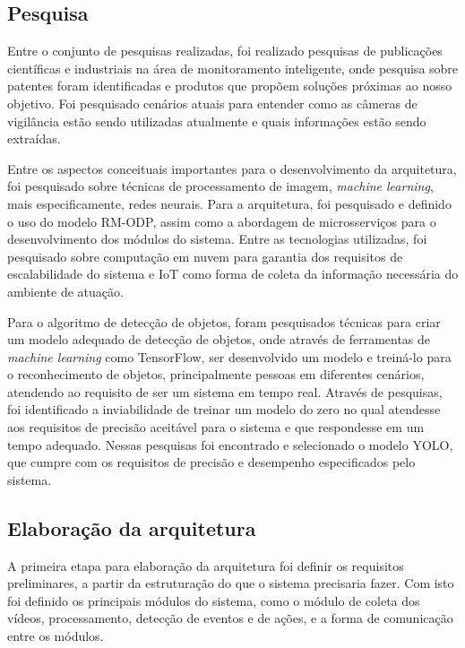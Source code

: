 \documentclass[]{politex}
\begin{document}
\subsection{Pesquisa}
Entre o conjunto de pesquisas realizadas, foi realizado pesquisas de publicações científicas e industriais na área de monitoramento inteligente, onde pesquisa sobre patentes foram identificadas e produtos que propõem soluções próximas ao nosso objetivo. Foi pesquisado cenários atuais para entender como as câmeras de vigilância estão sendo utilizadas atualmente e quais informações estão sendo extraídas.

Entre os aspectos conceituais importantes para o desenvolvimento da arquitetura, foi pesquisado sobre técnicas de processamento de imagem, \textit{machine learning}, mais especificamente, redes neurais. Para a arquitetura, foi pesquisado e definido o uso do modelo RM-ODP, assim como a abordagem de microsserviços para o desenvolvimento dos módulos do sistema. Entre as tecnologias utilizadas, foi pesquisado sobre computação em nuvem para garantia dos requisitos de escalabilidade do sistema e IoT como forma de coleta da informação necessária do ambiente de atuação. 

Para o algoritmo de detecção de objetos, foram pesquisados técnicas para criar um modelo adequado de detecção de objetos, onde através de ferramentas de \textit{machine learning} como TensorFlow, ser desenvolvido um modelo e treiná-lo para o reconhecimento de objetos, principalmente pessoas em diferentes cenários, atendendo ao requisito de ser um sistema em tempo real. Através de pesquisas, foi identificado a inviabilidade de treinar um modelo do zero no qual atendesse aos requisitos de precisão aceitável para o sistema e que respondesse em um tempo adequado. Nessas pesquisas foi encontrado e selecionado o modelo YOLO, que cumpre com os requisitos de precisão e desempenho especificados pelo sistema.

\subsection{Elaboração da arquitetura}
A primeira etapa para elaboração da arquitetura foi definir os requisitos preliminares, a partir da estruturação do que o sistema precisaria fazer. Com isto foi definido os principais módulos do sistema, como o módulo de coleta dos vídeos, processamento, detecção de eventos e de ações, e a forma de comunicação entre os módulos.
\end{document}
